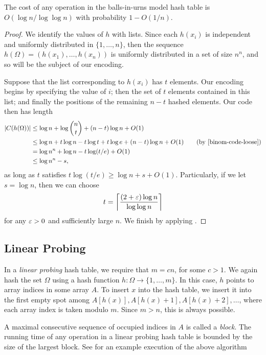 \begin{thm}
  The cost of any operation in the balls-in-urns model hash table is
  $O(\log n/\log \log n)$ with probability $1 - O(1/n)$.
\end{thm}
\begin{proof}
  We identify the values of $h$ with lists. Since each $h(x_i)$ is
  independent and uniformly distributed in $\{1, \ldots, n\}$, then
  the sequence $h(\Omega) = (h(x_1), \ldots, h(x_n))$ is uniformly
  distributed in a set of size $n^n$, and so will be the subject of
  our encoding.

  Suppose that the list corresponding to $h(x_i)$ has $t$
  elements. Our encoding begins by specifying the value of $i$; then
  the set of $t$ elements contained in this list; and finally the
  positions of the remaining $n - t$ hashed elements. Our code then
  has length
  \begin{align*}
    |C(h(\Omega))| &\leq \log n + \log {n \choose t} + (n - t) \log n + O(1) \\
                   &\leq \log n + t \log n - t \log t + t \log e + (n - t)\log n + O(1) \tag{by \eqref{binom-code-loose}} \\
                   &= \log n^n + \log n - t \log (t/e) + O(1) \\
                   &\leq \log n^n - s,
  \end{align*}
  as long as $t$ satisfies $t\log(t/e) \geq \log n + s + O(1)$.
  Particularly, if we let $s = \log n$, then we can choose
  \[t = \Ceil{\frac{(2 + \eps)\log n}{\log \log n}}\]
  for any $\varepsilon > 0$ and sufficiently large $n$. We finish by applying
  .
\end{proof}

\subsection{Linear Probing}

In a \emph{linear probing} hash table, we require that $m = cn$, for
some $c > 1$. We again hash the set $\Omega$ using a hash function $h
: \Omega \to \{1, \ldots, m\}$. In this case, $h$ points to array
indices in some array $A$. To insert $x$ into the hash table, we
insert it into the first empty spot among $A[h(x)], A[h(x) + 1],
A[h(x) + 2], \ldots$, where each array index is taken modulo
$m$. Since $m > n$, this is always possible.

A maximal consecutive sequence of occupied indices in $A$ is called a
\emph{block}. The running time of any operation in a linear probing
hash table is bounded by the size of the largest block. See
 for an example execution of the above algorithm

